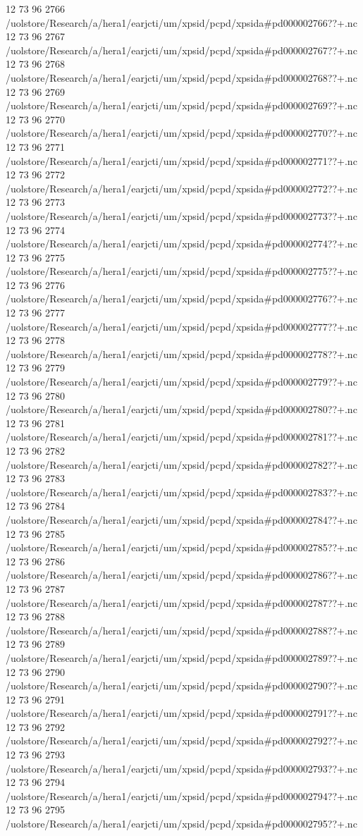 12 73 96
2766
/uolstore/Research/a/hera1/earjcti/um/xpsid/pcpd/xpsida#pd000002766??+.nc
12 73 96
2767
/uolstore/Research/a/hera1/earjcti/um/xpsid/pcpd/xpsida#pd000002767??+.nc
12 73 96
2768
/uolstore/Research/a/hera1/earjcti/um/xpsid/pcpd/xpsida#pd000002768??+.nc
12 73 96
2769
/uolstore/Research/a/hera1/earjcti/um/xpsid/pcpd/xpsida#pd000002769??+.nc
12 73 96
2770
/uolstore/Research/a/hera1/earjcti/um/xpsid/pcpd/xpsida#pd000002770??+.nc
12 73 96
2771
/uolstore/Research/a/hera1/earjcti/um/xpsid/pcpd/xpsida#pd000002771??+.nc
12 73 96
2772
/uolstore/Research/a/hera1/earjcti/um/xpsid/pcpd/xpsida#pd000002772??+.nc
12 73 96
2773
/uolstore/Research/a/hera1/earjcti/um/xpsid/pcpd/xpsida#pd000002773??+.nc
12 73 96
2774
/uolstore/Research/a/hera1/earjcti/um/xpsid/pcpd/xpsida#pd000002774??+.nc
12 73 96
2775
/uolstore/Research/a/hera1/earjcti/um/xpsid/pcpd/xpsida#pd000002775??+.nc
12 73 96
2776
/uolstore/Research/a/hera1/earjcti/um/xpsid/pcpd/xpsida#pd000002776??+.nc
12 73 96
2777
/uolstore/Research/a/hera1/earjcti/um/xpsid/pcpd/xpsida#pd000002777??+.nc
12 73 96
2778
/uolstore/Research/a/hera1/earjcti/um/xpsid/pcpd/xpsida#pd000002778??+.nc
12 73 96
2779
/uolstore/Research/a/hera1/earjcti/um/xpsid/pcpd/xpsida#pd000002779??+.nc
12 73 96
2780
/uolstore/Research/a/hera1/earjcti/um/xpsid/pcpd/xpsida#pd000002780??+.nc
12 73 96
2781
/uolstore/Research/a/hera1/earjcti/um/xpsid/pcpd/xpsida#pd000002781??+.nc
12 73 96
2782
/uolstore/Research/a/hera1/earjcti/um/xpsid/pcpd/xpsida#pd000002782??+.nc
12 73 96
2783
/uolstore/Research/a/hera1/earjcti/um/xpsid/pcpd/xpsida#pd000002783??+.nc
12 73 96
2784
/uolstore/Research/a/hera1/earjcti/um/xpsid/pcpd/xpsida#pd000002784??+.nc
12 73 96
2785
/uolstore/Research/a/hera1/earjcti/um/xpsid/pcpd/xpsida#pd000002785??+.nc
12 73 96
2786
/uolstore/Research/a/hera1/earjcti/um/xpsid/pcpd/xpsida#pd000002786??+.nc
12 73 96
2787
/uolstore/Research/a/hera1/earjcti/um/xpsid/pcpd/xpsida#pd000002787??+.nc
12 73 96
2788
/uolstore/Research/a/hera1/earjcti/um/xpsid/pcpd/xpsida#pd000002788??+.nc
12 73 96
2789
/uolstore/Research/a/hera1/earjcti/um/xpsid/pcpd/xpsida#pd000002789??+.nc
12 73 96
2790
/uolstore/Research/a/hera1/earjcti/um/xpsid/pcpd/xpsida#pd000002790??+.nc
12 73 96
2791
/uolstore/Research/a/hera1/earjcti/um/xpsid/pcpd/xpsida#pd000002791??+.nc
12 73 96
2792
/uolstore/Research/a/hera1/earjcti/um/xpsid/pcpd/xpsida#pd000002792??+.nc
12 73 96
2793
/uolstore/Research/a/hera1/earjcti/um/xpsid/pcpd/xpsida#pd000002793??+.nc
12 73 96
2794
/uolstore/Research/a/hera1/earjcti/um/xpsid/pcpd/xpsida#pd000002794??+.nc
12 73 96
2795
/uolstore/Research/a/hera1/earjcti/um/xpsid/pcpd/xpsida#pd000002795??+.nc
